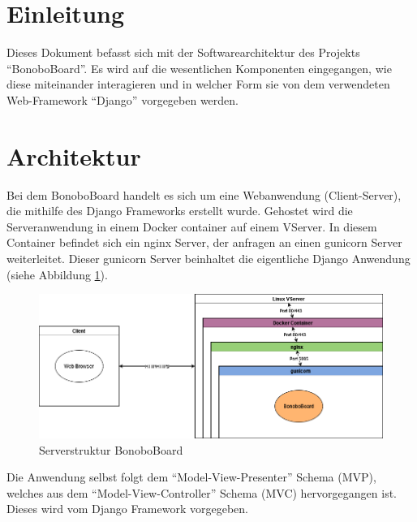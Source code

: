 \documentclass[a4paper,11pt]{scrartcl}
\begin{document}



\section{Einleitung}
Dieses Dokument befasst sich mit der Softwarearchitektur des Projekts "`BonoboBoard"'. Es wird auf die wesentlichen Komponenten eingegangen, wie diese miteinander interagieren und in welcher Form sie von dem verwendeten Web-Framework "`Django"' vorgegeben werden.

\section{Architektur}

Bei dem BonoboBoard handelt es sich um eine Webanwendung (Client-Server), die mithilfe des Django Frameworks erstellt wurde. Gehostet wird die Serveranwendung in einem Docker container auf einem  VServer. In diesem Container befindet sich ein nginx Server, der anfragen an einen gunicorn Server weiterleitet. Dieser gunicorn Server beinhaltet die eigentliche Django Anwendung (siehe Abbildung \ref{img:Serverstruktur}).

\begin{figure}[H]
	\includegraphics[width=\textwidth]{Serverstruktur}
	\caption{Serverstruktur BonoboBoard}
	\label{img:Serverstruktur}
\end{figure}

Die Anwendung selbst folgt dem "`Model-View-Presenter"' Schema (MVP), welches aus dem "`Model-View-Controller"' Schema (MVC) hervorgegangen ist. Dieses wird vom Django Framework vorgegeben.
\end{document}
